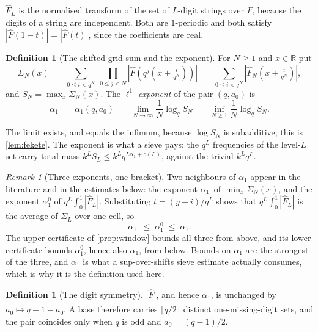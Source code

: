 \documentclass[11pt]{amsart}
\theoremstyle{definition}
\newtheorem{definition}[theorem]{Definition}
\theoremstyle{remark}
\newtheorem{remark}[theorem]{Remark}
\begin{document}
$\widehat{F}_{L}$ is the normalised transform of the set of $L$-digit strings over $F$, because the digits of a string are independent. Both are $1$-periodic and both satisfy $|\widehat{F}(1-t)| = |\widehat{F}(t)|$, since the coefficients are real.

\begin{definition}[The shifted grid sum and the exponent]
\label{def:alpha}
For $N \ge 1$ and $x \in \mathbb{R}$ put
\[
  \Sigma_{N}(x) \;=\; \sum_{0 \le i < q^{N}} \; \prod_{0 \le j < N} \left|\widehat{F}\!\left(q^{j}\!\left(x + \tfrac{i}{q^{N}}\right)\right)\right| \;=\; \sum_{0 \le i < q^{N}} \left|\widehat{F}_{N}\!\left(x + \tfrac{i}{q^{N}}\right)\right| ,
\]
and $S_{N} = \max_{x} \Sigma_{N}(x)$. The \emph{$\ell^{1}$ exponent} of the pair $(q, a_{0})$ is
\[
  \alpha_{1} \;=\; \alpha_{1}(q, a_{0}) \;=\; \lim_{N \to \infty} \frac{1}{N}\log_{q} S_{N} \;=\; \inf_{N \ge 1} \frac{1}{N}\log_{q} S_{N}.
\]
\end{definition}

The limit exists, and equals the infimum, because $\log S_{N}$ is subadditive; this is \cref{lem:fekete}. The exponent is what a sieve pays: the $q^{L}$ frequencies of the level-$L$ set carry total mass $k^{L}S_{L} \le k^{L}q^{L\alpha_{1}+o(L)}$, against the trivial $k^{L}q^{L}$.

\begin{remark}[Three exponents, one bracket]
\label{rem:three}
Two neighbours of $\alpha_{1}$ appear in the literature and in the estimates below: the exponent $\alpha_{1}^{-}$ of $\min_{x}\Sigma_{N}(x)$, and the exponent $\alpha_{1}^{0}$ of $q^{L}\int_{0}^{1}|\widehat{F}_{L}|$. Substituting $t = (y+i)/q^{L}$ shows that $q^{L}\int_{0}^{1}|\widehat{F}_{L}|$ is the average of $\Sigma_{L}$ over one cell, so
\[
  \alpha_{1}^{-} \;\le\; \alpha_{1}^{0} \;\le\; \alpha_{1}.
\]
The upper certificate of \cref{prop:window} bounds all three from above, and its lower certificate bounds $\alpha_{1}^{0}$, hence also $\alpha_{1}$, from below. Bounds on $\alpha_{1}$ are the strongest of the three, and $\alpha_{1}$ is what a sup-over-shifts sieve estimate actually consumes, which is why it is the definition used here.
\end{remark}

\begin{definition}[The digit symmetry]
\label{def:mirror}
$|\widehat{F}|$, and hence $\alpha_{1}$, is unchanged by $a_{0} \mapsto q-1-a_{0}$. A base therefore carries $\lceil q/2 \rceil$ distinct one-missing-digit sets, and the pair coincides only when $q$ is odd and $a_{0} = (q-1)/2$.
\end{definition}
\end{document}

